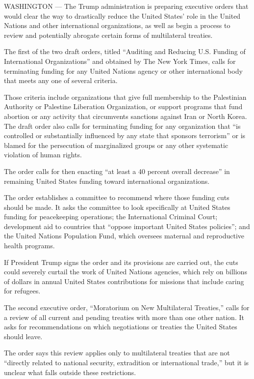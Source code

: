 WASHINGTON --- The Trump administration is preparing executive orders
that would clear the way to drastically reduce the United States' role
in the United Nations and other international organizations, as well as
begin a process to review and potentially abrogate certain forms of
multilateral treaties.

The first of the two draft orders, titled ``Auditing and Reducing U.S.
Funding of International Organizations'' and obtained by The New York
Times, calls for terminating funding for any United Nations agency or
other international body that meets any one of several criteria.

Those criteria include organizations that give full membership to the
Palestinian Authority or Palestine Liberation Organization, or support
programs that fund abortion or any activity that circumvents sanctions
against Iran or North Korea. The draft order also calls for terminating
funding for any organization that ``is controlled or substantially
influenced by any state that sponsors terrorism'' or is blamed for the
persecution of marginalized groups or any other systematic violation of
human rights.

The order calls for then enacting ``at least a 40 percent overall
decrease'' in remaining United States funding toward international
organizations.

The order establishes a committee to recommend where those funding cuts
should be made. It asks the committee to look specifically at United
States funding for peacekeeping operations; the International Criminal
Court; development aid to countries that ``oppose important United
States policies''; and the United Nations Population Fund, which
oversees maternal and reproductive health programs.

If President Trump signs the order and its provisions are carried out,
the cuts could severely curtail the work of United Nations agencies,
which rely on billions of dollars in annual United States contributions
for missions that include caring for refugees.

The second executive order, ``Moratorium on New Multilateral Treaties,''
calls for a review of all current and pending treaties with more than
one other nation. It asks for recommendations on which negotiations or
treaties the United States should leave.

The order says this review applies only to multilateral treaties that
are not ``directly related to national security, extradition or
international trade,'' but it is unclear what falls outside these
restrictions.

